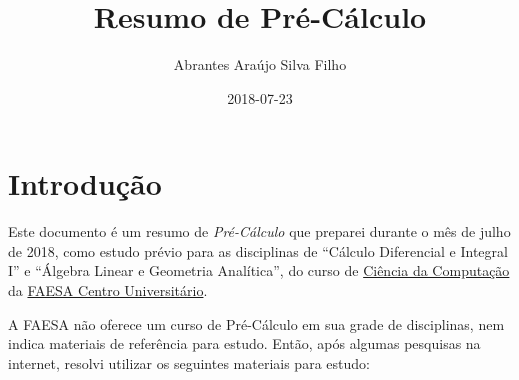\documentclass[pdftex, brazil, 12pt, twoside]{article}
\begin{document}
\title{Resumo de Pré-Cálculo}
\author{Abrantes Araújo Silva Filho}
\date{2018-07-23}
\maketitle
\tableofcontents
\newpage


\section{Introdução}
\label{intro}

Este documento é um resumo de \emph{Pré-Cálculo} que preparei durante o mês de julho
de 2018, como estudo prévio para as disciplinas de ``Cálculo Diferencial e Integral I''
e ``Álgebra Linear e Geometria Analítica'', do curso de
\href{https://www.faesa.br/curso/ciencia-da-computacao/}{Ciência da Computação}
da \href{https://www.faesa.br/}{FAESA Centro Universitário}.

A FAESA não oferece um curso de Pré-Cálculo em sua grade de disciplinas, nem indica
materiais de referência para estudo. Então, após algumas pesquisas na internet,
resolvi utilizar os seguintes materiais para estudo:
\end{document}
